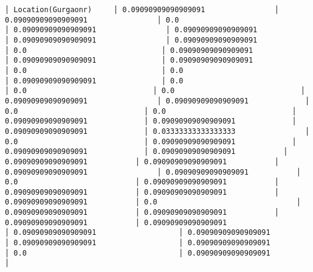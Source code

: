 \documentclass[11pt]{article}
\begin{document}
\begin{Verbatim}[commandchars=\\\{\}]
│ Location(Gurgaonr)     │ 0.09090909090909091                │ 0.09090909090909091                │ 0.0                                │ 0.09090909090909091                │ 0.09090909090909091                │ 0.09090909090909091                │ 0.09090909090909091                │ 0.0                               │ 0.09090909090909091               │ 0.09090909090909091               │ 0.09090909090909091                │ 0.0                               │ 0.0                               │ 0.09090909090909091               │ 0.0                             │ 0.0                             │ 0.0                             │ 0.09090909090909091                │ 0.09090909090909091             │ 0.0                             │ 0.0                             │ 0.09090909090909091             │ 0.09090909090909091             │ 0.09090909090909091             │ 0.03333333333333333                │ 0.0                             │ 0.09090909090909091             │ 0.09090909090909091             │ 0.09090909090909091           │ 0.09090909090909091           │ 0.09090909090909091           │ 0.09090909090909091                │ 0.09090909090909091           │ 0.0                           │ 0.09090909090909091           │ 0.09090909090909091           │ 0.09090909090909091           │ 0.09090909090909091           │ 0.0                                │ 0.09090909090909091           │ 0.09090909090909091           │ 0.09090909090909091           │ 0.09090909090909091                   │ 0.09090909090909091                   │ 0.09090909090909091                   │ 0.09090909090909091                   │ 0.09090909090909091                   │ 0.0                                   │ 0.09090909090909091                   │

\end{Verbatim}
\end{document}

